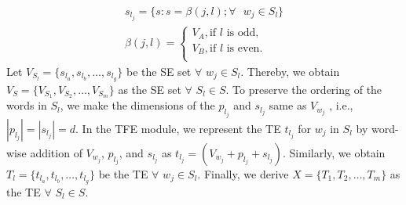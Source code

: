 \documentclass[preprint,review,12pt]{elsarticle}
\begin{document}
\begin{equation}  \label{eq2}
	\begin{aligned}
	s_{l_j} =  \{ s : s = \beta(j,l);  \forall \text{  }  w_j \in S_l\} \\
	\beta(j,l)=
		\begin{cases}
			V_{A},                 \text {if $l$ is odd}, \\
			V_{B},                 \text {if $l$ is even} . \\
		\end{cases}
	\end{aligned}
\end{equation}
 Let $V_{S_l} = \{s_{l_a}, s_{l_b}, \ldots, s_{l_g}\}$ be the SE set $\forall$ $w_j \in S_l$. Thereby, we obtain $V_S = \{V_{S_1}, V_{S_2}, \ldots, V_{S_m}\}$ as the SE set $\forall$ $S_l \in S$. To preserve the ordering of the words in $S_l$, we make the dimensions of the  $p_{l_j}$ and $s_{l_j}$  same as $V_{w_j}$ , i.e.,  $|p_{l_j}| = |s_{l_j}| = d$. In the TFE module, we represent the TE $t_{l_j}$  for $w_j$ in $S_l$ by word-wise addition of $V_{w_j}$, $p_{l_j}$, and $s_{l_j}$ as $t_{l_j} =  ( V_{w_j} + p_{l_j} + s_{l_j} )$. Similarly, we obtain $T_l = \{t_{l_a}, t_{l_b}, \ldots, t_{l_g}\}$ be the TE $\forall$ $w_j \in S_l$. Finally, we derive $X = \{T_1, T_2, \ldots, T_m\}$ as the TE $\forall$ $S_l \in S$.
\end{document}

